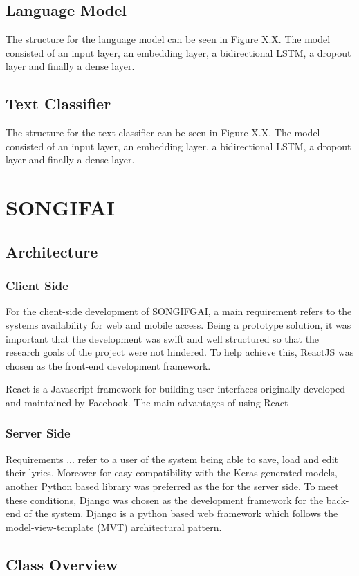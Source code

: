 \subsection{Language Model}
The structure for the language model can be seen in Figure X.X. The model consisted of an input layer, an embedding layer, a bidirectional LSTM, a dropout layer and finally a dense layer.
\subsection{Text Classifier}
The structure for the text classifier can be seen in Figure X.X. The model consisted of an input layer, an embedding layer, a bidirectional LSTM, a dropout layer and finally a dense layer.
\section{SONGIFAI}
\subsection{Architecture}
\subsubsection{Client Side}
For the client-side development of SONGIFGAI, a main requirement refers to the systems availability for web and mobile access. Being a prototype solution, it was important that the development was swift and well structured so that the research goals of the project were not hindered. To help achieve this, ReactJS was chosen as the front-end development framework.

\noindent
\newline
React is a Javascript framework for building user interfaces originally developed and maintained by Facebook. The main advantages of using React
\subsubsection{Server Side}
Requirements ... refer to a user of the system being able to save, load and edit their lyrics. Moreover for easy compatibility with the Keras generated models, another Python based library was preferred as the for the server side. To meet these conditions, Django was chosen as the development framework for the back-end of the system. Django is a python based web framework which follows the model-view-template (MVT) architectural pattern.
\subsection{Class Overview}